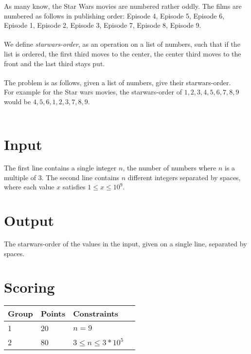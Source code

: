 As many know, the Star Wars movies are numbered rather oddly. The films are numbered as follows in publishing order:
Episode 4, Episode 5, Episode 6, Episode 1, Episode 2, Episode 3, Episode 7, Episode 8, Episode 9.\\\\
We define \textit{starwars-order}, as an operation on a list of numbers, such that if the list is ordered, the first third moves to the center,
the center third moves to the front and the last third stays put. \\\\
The problem is as follows, given a list of numbers, give their starwars-order.\\ For example for the Star wars movies, the starwars-order of
$1, 2, 3, 4, 5, 6, 7, 8, 9$ would be $4, 5, 6, 1, 2, 3, 7, 8, 9$.\\\\

\section*{Input}
The first line contains a single integer $n$, the number of numbers where $n$ is a multiple of $3$.
The second line contains $n$ different integers separated by spaces, where each value $x$ satisfies $1 \leq x \leq 10^9$.

\section*{Output}
The starwars-order of the values in the input, given on a single line, separated by spaces.

\section*{Scoring}
\begin{tabular}{|l|l|l|l|}
\hline
Group & Points & Constraints \\ \hline
1     & 20     & $n = 9$ \\ \hline
2     & 80     & $3 \leq n \leq 3*10^5$ \\ \hline
\end{tabular}
